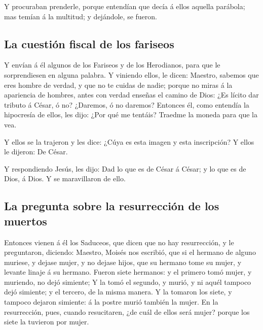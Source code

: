  Y procuraban prenderle, porque entendían que decía á
ellos aquella parábola; mas temían á la multitud; y dejándole, se
fueron.

\hypertarget{la-cuestiuxf3n-fiscal-de-los-fariseos}{%
\subsection{La cuestión fiscal de los
fariseos}\label{la-cuestiuxf3n-fiscal-de-los-fariseos}}

 Y envían á él algunos de los Fariseos y de los
Herodianos, para que le sorprendiesen en alguna palabra. 
Y viniendo ellos, le dicen: Maestro, sabemos que eres hombre de verdad,
y que no te cuidas de nadie; porque no miras á la apariencia de hombres,
antes con verdad enseñas el camino de Dios: ¿Es lícito dar tributo á
César, ó no? ¿Daremos, ó no daremos?  Entonces él, como
entendía la hipocresía de ellos, les dijo: ¿Por qué me tentáis? Traedme
la moneda para que la vea.

 Y ellos se la trajeron y les dice: ¿Cúya es esta imagen
y esta inscripción? Y ellos le dijeron: De César.

 Y respondiendo Jesús, les dijo: Dad lo que es de César á
César; y lo que es de Dios, á Dios. Y se maravillaron de ello.

\hypertarget{la-pregunta-sobre-la-resurrecciuxf3n-de-los-muertos}{%
\subsection{La pregunta sobre la resurrección de los
muertos}\label{la-pregunta-sobre-la-resurrecciuxf3n-de-los-muertos}}

 Entonces vienen á él los Saduceos, que dicen que no hay
resurrección, y le preguntaron, diciendo:  Maestro,
Moisés nos escribió, que si el hermano de alguno muriese, y dejase
mujer, y no dejase hijos, que su hermano tome su mujer, y levante linaje
á su hermano.  Fueron siete hermanos: y el primero tomó
mujer, y muriendo, no dejó simiente;  Y la tomó el
segundo, y murió, y ni aquél tampoco dejó simiente; y el tercero, de la
misma manera.  Y la tomaron los siete, y tampoco dejaron
simiente: á la postre murió también la mujer.  En la
resurrección, pues, cuando resucitaren, ¿de cuál de ellos será mujer?
porque los siete la tuvieron por mujer.

